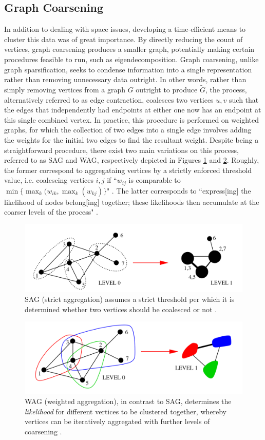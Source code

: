 \documentclass{article}
\begin{document}
\subsection{Graph Coarsening}\label{coarsening-bg}
In addition to dealing with space issues, developing a time-efficient means to cluster this data was of great importance. By directly reducing the count of vertices, graph coarsening produces a smaller graph, potentially making certain procedures feasible to run, such as eigendecomposition. Graph coarsening, unlike graph sparsification, seeks to condense information into a single representation rather than removing unnecessary data outright. In other words, rather than simply removing vertices from a graph $G$ outright to produce $\widetilde{G}$, the process, alternatively referred to as edge contraction, coalesces two vertices $u,v$ such that the edges that independently had endpoints at either one now has an endpoint at this single combined vertex. In practice, this procedure is performed on weighted graphs, for which the collection of two edges into a single edge involves adding the weights for the initial two edges to find the resultant weight. Despite being a straightforward procedure, there exist two main variations on this process, referred to as SAG and WAG, respectively depicted in Figures \ref{fig:sag} and  \ref{fig:wag}. Roughly, the former correspond to aggregataing vertices by a strictly enforced threshold value, i.e. coalescing vertices $i,j$ if ``$w_{ij}$ is comparable to $\min\{\max_k(w_{ik}, \max_k(w_{kj})\}$" \cite{coarsening}. The latter corresponds to ``express[ing]  the likelihood of nodes belong[ing] together; these likelihoods then accumulate at the coarser levels of the process" \cite{coarsening}. 

\begin{figure}
    \centering
    \includegraphics[width=.60\textwidth]{sag.png}
    \caption[SAG Coarsening]{SAG (strict aggregation) assumes a strict threshold per which it is determined whether two vertices should be coalesced or not \cite{coarsening}.}
    \label{fig:sag}
\end{figure}

\begin{figure}
    \centering
    \includegraphics[width=.60\textwidth]{wag.png}
    \caption[WAG Coarsening]{WAG (weighted aggregation), in contrast to SAG, determines the \textit{likelihood} for different vertices to be clustered together, whereby vertices can be iteratively aggregated with further levels of coarsening \cite{coarsening}.}
    \label{fig:wag}
\end{figure}
\end{document}
